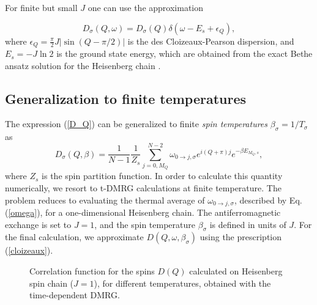 \documentclass[article,11pt]{revtex4}
\begin{document}
For finite but small $J$ one can use the approximation \cite{Penc1997b}

\begin{equation}
D_{\sigma}(Q,\omega) = D_{\sigma}(Q) \delta (\omega - E_s + \epsilon_Q),
\label{cloizeaux}
\end{equation}
%
where $\epsilon_Q = \frac{\pi}{2} J |\sin(Q-\pi/2)|$ is the des Cloizeaux-Pearson dispersion, and $E_s = - J \ln 2$ is the ground state energy, which are obtained from the exact Bethe ansatz solution for the Heisenberg chain \cite{Cloizeaux}.



\subsection {Generalization to finite temperatures}

The expression (\ref{D_Q}) can be generalized to finite {\it spin temperatures} $\beta_\sigma=1/T_\sigma$ as
\begin{equation}
\label{D_Q_beta}
D_{\sigma}(Q,\beta) = \frac{1}{N-1} \frac{1}{Z_s} \sum_{j=0,M_Q}^{N-2} \omega_{0 \rightarrow j,\sigma} e^{i (Q+\pi)j} e^{- \beta E_{M_Q,s}},
\end{equation}
where $Z_s$ is the spin partition function.
In order to calculate  this quantity numerically, we resort to t-DMRG calculations at finite temperature. The problem reduces to evaluating the thermal average of $\omega_{0 \rightarrow j,\sigma}$, described by Eq.(\ref{omega}), for a one-dimensional Heisenberg chain. The antiferromagnetic exchange is set to $J=1$, and the spin temperature $\beta_\sigma$ is defined in units of $J$. For the final calculation, we approximate $D(Q,\omega,\beta_\sigma)$ using the prescription (\ref{cloizeaux}). 

\begin{figure}
\epsfxsize=7cm \centerline{}
\caption{ 
Correlation function for the spins $D(Q)$ calculated on Heisenberg spin chain ($J=1$), for different temperatures, obtained with the time-dependent DMRG.
}
\label{figure1}
\vspace{0.25cm}
\end{figure}
\end{document}
